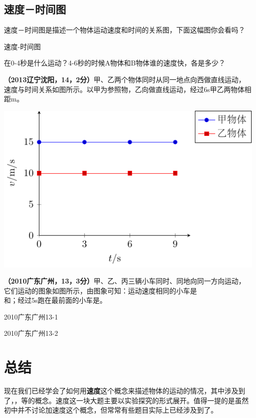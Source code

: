 \documentclass[12pt,twoside]{exam}
\begin{document}
\begin{knowledge}
\subsection{速度－时间图}
速度－时间图是描述一个物体运动速度和时间的关系图，下面这幅图你会看吗？
\begin{fig}{速度-时间图}
\end{fig}

在0-4秒是什么运动？4-6秒的时候A物体和B物体谁的速度快，各是多少？


\textbf{（2013辽宁沈阳，14，2分）}甲、乙两个物体同时从同一地点向西做直线运动，速度与时间关系如图所示。以甲为参照物，乙向\answerline*[东]做直线运动，经过6s甲乙两物体相距\answerline*[30]m。

\hfill
\includegraphics[scale=1]{figures/2013辽宁沈阳14.pdf} 


\textbf{（2010广东广州，13，3分）}甲、乙、丙三辆小车同时、同地向同一方向运动，它们运动的图象如图所示，由图象可知：运动速度相同的小车是\answerline*[甲]\\和\answerline*[丙]；经过5s跑在最前面的小车是\answerline*[乙]。
\begin{multicols}{2}
\begin{linefig}{2010广东广州13-1}
\end{linefig}
\columnbreak
\begin{linefig}{2010广东广州13-2}
\end{linefig}
\end{multicols}


\section{总结}
现在我们已经学会了如何用\textbf{速度}这个概念来描述物体的运动的情况，其中涉及到了，，等的概念。速度这一块大题主要以实验探究的形式展开。值得一提的是虽然初中并不讨论加速度这个概念，但常常有些题目实际上已经涉及到了。


\end{knowledge}
\end{document}
